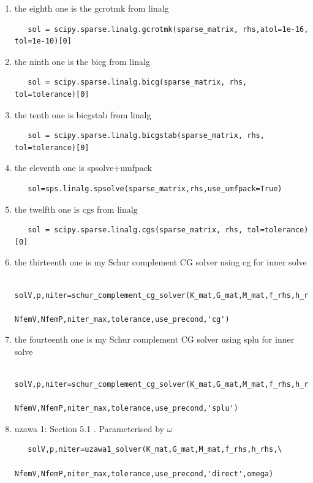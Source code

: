 \begin{enumerate}
\item the eighth one is the gcrotmk from linalg
\begin{lstlisting}
   sol = scipy.sparse.linalg.gcrotmk(sparse_matrix, rhs,atol=1e-16, tol=1e-10)[0]
\end{lstlisting}
\item the ninth one is the bicg from linalg
\begin{lstlisting}
   sol = scipy.sparse.linalg.bicg(sparse_matrix, rhs, tol=tolerance)[0]
\end{lstlisting}
\item the tenth one is bicgstab from linalg
\begin{lstlisting}
   sol = scipy.sparse.linalg.bicgstab(sparse_matrix, rhs, tol=tolerance)[0]
\end{lstlisting}
\item the eleventh one is spsolve+umfpack 
\begin{lstlisting}
   sol=sps.linalg.spsolve(sparse_matrix,rhs,use_umfpack=True)
\end{lstlisting}
\item the twelfth one is cgs from linalg
\begin{lstlisting}
   sol = scipy.sparse.linalg.cgs(sparse_matrix, rhs, tol=tolerance)[0]
\end{lstlisting}
\item the thirteenth one is my Schur complement CG solver using cg for inner solve
\begin{lstlisting}
   solV,p,niter=schur_complement_cg_solver(K_mat,G_mat,M_mat,f_rhs,h_rhs,\
                                           NfemV,NfemP,niter_max,tolerance,use_precond,'cg')
\end{lstlisting}
\item the fourteenth one is my Schur complement CG solver using splu for inner solve
\begin{lstlisting}
   solV,p,niter=schur_complement_cg_solver(K_mat,G_mat,M_mat,f_rhs,h_rhs,\
                                           NfemV,NfemP,niter_max,tolerance,use_precond,'splu')
\end{lstlisting}
\item uzawa 1: Section 5.1 \cite{braess}. Parameterised by $\omega$
\begin{lstlisting}
   solV,p,niter=uzawa1_solver(K_mat,G_mat,M_mat,f_rhs,h_rhs,\
                       NfemV,NfemP,niter_max,tolerance,use_precond,'direct',omega)
\end{lstlisting}


\end{enumerate}
